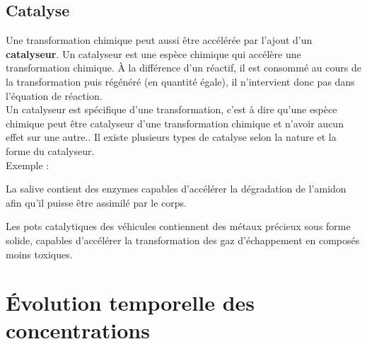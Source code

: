 \documentclass[a4paper,13pt,fleqn]{scrartcl}%
\begin{document}
    \subsection{Catalyse}
    Une transformation chimique peut aussi être accélérée par l'ajout d'un \textbf{catalyseur}. Un catalyseur est une espèce chimique qui accélère une transformation chimique. À la différence d'un réactif, il est consommé au cours de la transformation puis régénéré (en quantité égale), il n'intervient donc pas dans l'équation de réaction.\\
    Un catalyseur est spécifique d'une transformation, c'est à dire qu'une espèce chimique peut être catalyseur d'une transformation chimique et n'avoir aucun effet sur une autre.. Il existe plusieurs types de catalyse selon la nature et la forme du catalyseur.\\
    Exemple : 
    \begin{itemize*}
        \item La salive contient des enzymes capables d'accélérer la dégradation de l'amidon afin qu'il puisse être assimilé par le corps.
        \item Les pots catalytiques des véhicules contiennent des métaux précieux sous forme solide, capables d'accélérer la transformation des gaz d'échappement en composés moins toxiques.
    \end{itemize*}

\section{Évolution temporelle des concentrations}
\end{document}
